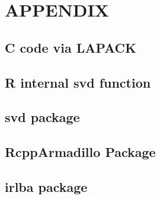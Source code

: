\documentclass[12pt]{article}
\begin{document}
\newpage
\section*{APPENDIX}
\subsection*{C code via LAPACK}
	
\subsection*{R internal svd function}
	
\subsection*{svd package}

\subsection*{RcppArmadillo Package}
\subsection*{irlba package}
\end{document}
